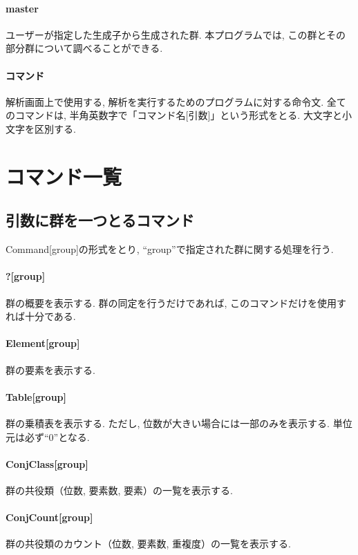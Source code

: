 \documentclass[11pt, a4paper]{jsarticle}
\begin{document}
\paragraph{master}
ユーザーが指定した生成子から生成された群.
本プログラムでは, この群とその部分群について調べることができる.

\paragraph{コマンド}
解析画面上で使用する, 解析を実行するためのプログラムに対する命令文.
全てのコマンドは, 半角英数字で「コマンド名[引数]」という形式をとる.
大文字と小文字を区別する.

\section{コマンド一覧}

\subsection{引数に群を一つとるコマンド}
Command[group]の形式をとり, ``group''で指定された群に関する処理を行う.

\paragraph{?[group]}
群の概要を表示する.
群の同定を行うだけであれば, このコマンドだけを使用すれば十分である.

\paragraph{Element[group]}
群の要素を表示する.

\paragraph{Table[group]}
群の乗積表を表示する.
ただし, 位数が大きい場合には一部のみを表示する.
単位元は必ず``0''となる.

\paragraph{ConjClass[group]}
群の共役類（位数, 要素数, 要素）の一覧を表示する.

\paragraph{ConjCount[group]}
群の共役類のカウント（位数, 要素数, 重複度）の一覧を表示する.
\end{document}
